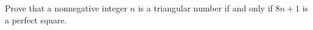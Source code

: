 Prove that a nonnegative integer $n$ is a triangular number if and only if $8n+1$ is a perfect square.
